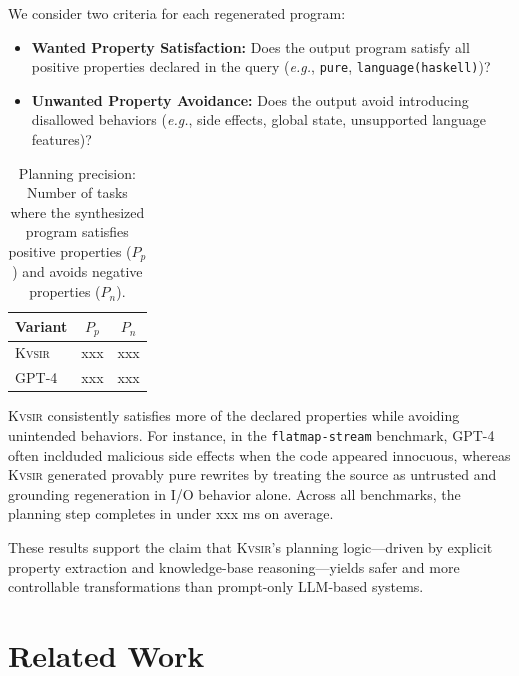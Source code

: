 \documentclass[noacm,sigplan]{acmart}
\def\eg{{\em e.g.}, }
\newcommand{\sys}{{\scshape Kv{\textalpha}sir}\xspace}
\newcommand{\xxx}{\colorbox{red!30}{xxx}\xspace}
\begin{document}
We consider two criteria for each regenerated program:

\begin{itemize}
  \item \textbf{Wanted Property Satisfaction:} Does the output program satisfy all positive properties declared in the query (\eg \texttt{pure}, \texttt{language(haskell)})?
  \item \textbf{Unwanted Property Avoidance:} Does the output avoid introducing disallowed behaviors (\eg side effects, global state, unsupported language features)?
\end{itemize}

\begin{table}[h]
  \centering
  \caption{
    Planning precision: Number of tasks where the synthesized program satisfies positive properties ($P_p$) and avoids negative properties ($P_n$).
  }
  \begin{tabular}{lcc}
    \toprule
    Variant & $P_{p}$ & $P_{n}$  \\
    \midrule
    \sys & \xxx & \xxx \\
    GPT-4 & \xxx & \xxx \\
    \bottomrule
  \end{tabular}
\end{table}

\sys consistently satisfies more of the declared properties while avoiding
unintended behaviors. For instance, in the \texttt{flatmap-stream} benchmark,
GPT-4 often inclduded malicious side effects when the code appeared innocuous,
whereas \sys generated provably pure rewrites by treating the source as
untrusted and grounding regeneration in I/O behavior alone.
Across all benchmarks, the planning step completes in under \xxx ms on average.

These results support the claim that \sys's planning logic---driven by explicit
property extraction and knowledge-base reasoning---yields safer and more
controllable transformations than prompt-only LLM-based systems.

\section{Related Work}
\end{document}
